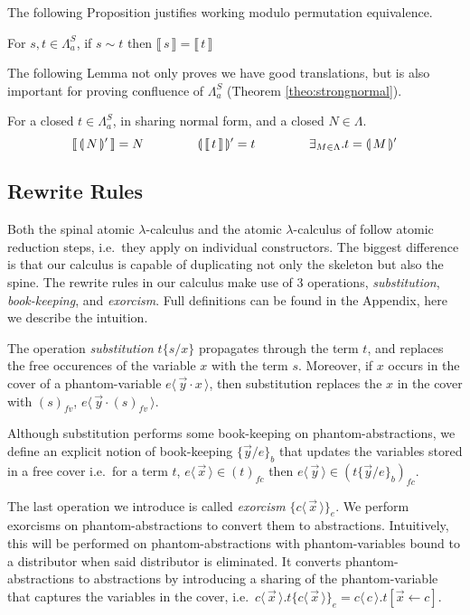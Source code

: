 \documentclass[a4paper,UKenglish,cleveref, autoref]{lipics-v2019}
\newcommand{\FALC}{\Lambda^{S}_{a}}
\newcommand{\fv}[1]{(#1)_{fv}}
\newcommand{\fc}[1]{(#1)_{fc}}
\newcommand{\fake}[3]{#1 \langle \, #2 \, \rangle . #3}
\newcommand{\share}[3]{#1 [#2 \leftarrow #3]}
\newcommand{\fakedist}[2]{#1 \langle \, #2 \, \rangle}
\newcommand{\sub}[3]{#1 \{ #2 / #3 \}}
\newcommand{\psub}[3]{#1 \{ #2 / #3 \}_{b}}
\newcommand{\exor}[3]{#1 \{ \fakedist{#2}{#3} \}_{e}}
\newcommand{\readback}[2]{\llbracket \, #1 \, \rrbracket}
\newcommand{\compile}[1]{\llparenthesis \, #1 \, \rrparenthesis}
\newcommand{\trans}[1]{\llbracket \, #1 \, \rrbracket}
\begin{document}
\noindent The following Proposition justifies working modulo permutation equivalence.

\begin{proposition}
\label{lem:preservedenotationsim}
For $s, t \in \FALC$, if $s \sim t$ then $\trans{s} = \trans{t}$
\end{proposition}

\noindent The following Lemma not only proves we have good translations, but is also important for proving confluence of $\FALC$ (Theorem \ref{theo:strongnormal}).

\begin{lemma}
\label{lem:preserve1to1correspondance}
For a closed $t \in \FALC$, in sharing normal form, and a closed $N \in \Lambda$.
$$\readback{\compile{N}'}{I} = N \hspace{1.5cm} \compile{\readback{t}{I}}' = t \hspace{1.5cm} \exists_{ M \in \Lambda} . t = \compile{M}'$$
\end{lemma}

\subsection{Rewrite Rules}

Both the spinal atomic $\lambda$-calculus and the atomic $\lambda$-calculus of \cite{gundersen2013atomic} follow atomic reduction steps, i.e.\ they apply on individual constructors. The biggest difference is that our calculus is capable of duplicating not only the skeleton but also the spine. The rewrite rules in our calculus make use of 3 operations, \emph{substitution}, \emph{book-keeping}, and \emph{exorcism}. Full definitions can be found in the Appendix, here we describe the intuition.

The operation \emph{substitution} $\sub{t}{s}{x}$ propagates through the term $t$, and replaces the free occurences of the variable $x$ with the term $s$. Moreover, if $x$ occurs in the cover of a phantom-variable $\fakedist{e}{\vec{y} \cdot x}$, then substitution replaces the $x$ in the cover with $\fv{s}$, $\fakedist{e}{\vec{y} \cdot \fv{s}}$. 

Although substitution performs some book-keeping on phantom-abstractions, we define an explicit notion of book-keeping $\psub{}{\vec{y}}{e}$ that updates the variables stored in a free cover i.e.\ for a term $t$, $\fakedist{e}{\vec{x}} \in \fc{t}$ then $\fakedist{e}{\vec{y}} \in \fc{\psub{t}{\vec{y}}{e}}$. 

The last operation we introduce is called \emph{exorcism} $\exor{}{c}{\vec{x}}$. We perform exorcisms on phantom-abstractions to convert them to abstractions. Intuitively, this will be performed on phantom-abstractions with phantom-variables bound to a distributor when said distributor is eliminated. It converts phantom-abstractions to abstractions by introducing a sharing of the phantom-variable that captures the variables in the cover, i.e.\ $\fake{c}{\vec{x}}{t} \exor{}{c}{\vec{x}} = \fake{c}{c}{\share{t}{\vec{x}}{c}}$. 
\end{document}
